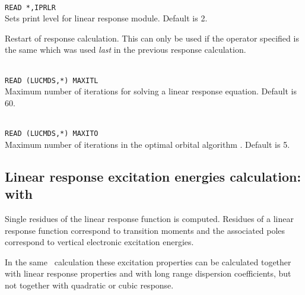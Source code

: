 \begin{description}
\item{}\\
\verb|READ *,IPRLR|\\
Sets print level for linear response module. Default is 2.
 
\item{}
Restart of response calculation. This
can only be used if the  
operator specified is the same which was used \textit{last} in the previous
response calculation.

\item{}\\
\verb|READ (LUCMDS,*) MAXITL|\\
Maximum number of iterations for solving a linear response 
equation. Default is 60.

\item{}\\
\verb|READ (LUCMDS,*) MAXITO|\\
Maximum number of iterations in the optimal orbital
algorithm
\cite{tuhjahjajpjjcp84}. 
Default is 5.


\end{description}

\subsection{Linear response excitation energies calculation:  with }

Single residues of the linear
response function is
computed. Residues of a linear response function correspond to
transition moments and the associated poles
correspond to vertical electronic excitation energies.

In the same \resp\ calculation these excitation properties can be calculated
together with linear response properties
and with long range dispersion coefficients, but not 
together with quadratic or cubic response.

